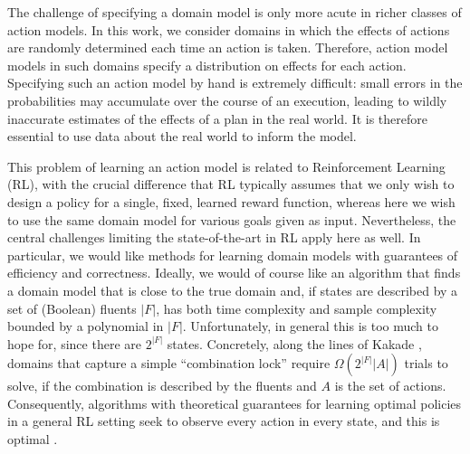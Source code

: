\documentclass[letterpaper]{article} %
\begin{document}
The challenge of specifying a domain model is only more acute in richer classes of action models. 
In this work, we consider domains in which the effects of actions are randomly determined each time an action is taken. 
Therefore, action model models in such domains specify a distribution on effects for each action. 
Specifying such an action model by hand is extremely difficult: small errors in the probabilities may accumulate over the course of an execution, leading to wildly inaccurate estimates of the effects of a plan in the real world. 
It is therefore essential to use data about the real world to inform the model.




This problem of learning an action model is related to Reinforcement Learning (RL), with the crucial difference that RL typically assumes that we only wish to design a policy for a single, fixed, learned reward function, whereas here we wish to use the same domain model for various goals given as input. %
Nevertheless, the central challenges limiting the state-of-the-art in RL apply here as well.
In particular, we would like methods for learning domain models with guarantees of efficiency and correctness. Ideally, we would of course like an algorithm that finds a domain model that is close to the true domain and, if states are described by a set of (Boolean) fluents $|F|$, has both time complexity and sample complexity bounded by a polynomial in $|F|$. Unfortunately, in general this is  too much to hope for, since there are $2^{|F|}$ states. Concretely, along the lines of Kakade , domains that capture a simple ``combination lock'' require $\Omega(2^{|F|}|A|)$ trials to solve, if the combination is described by the fluents and $A$ is the set of actions. Consequently, algorithms with theoretical guarantees for learning optimal policies in a general RL setting seek to observe every action in every state, and this is optimal \cite{strehl2006pac}. 
\end{document}
